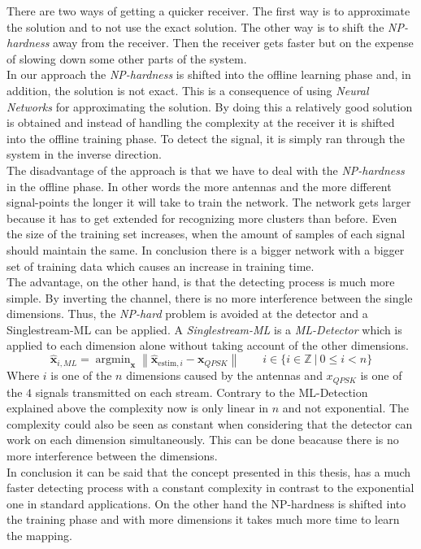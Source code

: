 \documentclass[oneside]{msvreport}%
\DeclareMathOperator*{\argmin}{argmin}
\newcommand{\norm}[1]{\left\lVert#1\right\rVert}
\newcommand{\B}[1]{\boldsymbol{#1}}
\newcommand{\Bhat}[1]{\boldsymbol{\hat{#1}}}
\newcommand{\e}[1]{\emph{#1}}
\begin{document}
\noindent There are two ways of getting a quicker receiver. The first way is to approximate the solution and to not use the exact solution. The other way is to shift the \e{NP-hardness} away from the receiver. Then the receiver gets faster but on the expense of slowing down some other parts of the system. \\ 
In our approach the \e{NP-hardness} is shifted into the offline learning phase and, in addition, the solution is not exact. This is a consequence of using \e{Neural Networks} for approximating the solution. By doing this  a relatively good solution is obtained and instead of handling the complexity at the receiver it is shifted into the offline training phase. To detect the signal, it is simply ran through the system in the inverse direction.\\ 
The disadvantage of the approach is that we have to deal with the \e{NP-hardness} in the offline phase. In other words the more antennas and the more different signal-points the longer it will take to train the network. The network gets larger because it has to get extended for recognizing more clusters than before. Even the size of the training set increases, when the amount of samples of each signal should maintain the same. In conclusion there is a bigger network with a bigger set of training data which causes an increase in training time.\\
The advantage, on the other hand, is that the detecting process is much more simple. By inverting the channel, there is no more interference between the single dimensions. Thus, the \e{NP-hard} problem is avoided at the detector and a Singlestream-ML can be applied. A \e{Singlestream-ML} is a \e{ML-Detector} which is applied to each dimension alone without taking account of the other dimensions. 
\begin{equation}
  \Bhat{x}_{i, ML} = \argmin_{\B{x}} \norm{\Bhat{x}_{\text{estim},i} - \B{x}_{QPSK}} \qquad i \in \{i \in \mathbb{Z} \ | \ 0 \le i < n\}
\end{equation}
Where $i$ is one of the $n$ dimensions caused by the antennas and $x_{QPSK}$ is one of the $4$ signals transmitted on each stream. Contrary to the ML-Detection explained above the complexity now is only linear in $n$ and not exponential. The complexity could also be seen as constant when considering that the detector can work on each dimension simultaneously. This can be done beacause there is no more interference between the dimensions.\\
In conclusion it can be said that the concept presented in this thesis, has a much faster detecting process with a constant complexity in contrast to the exponential one in standard applications. On the other hand the NP-hardness is shifted into the training phase and with more dimensions it takes much more time to learn the mapping.
\end{document}
